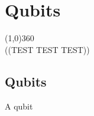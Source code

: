 \chapter{Qubits}
\line(1,0){360} \\
((TEST TEST TEST))
\section{Qubits}
\begin{defn}[Qubit]
    A qubit
\end{defn}
